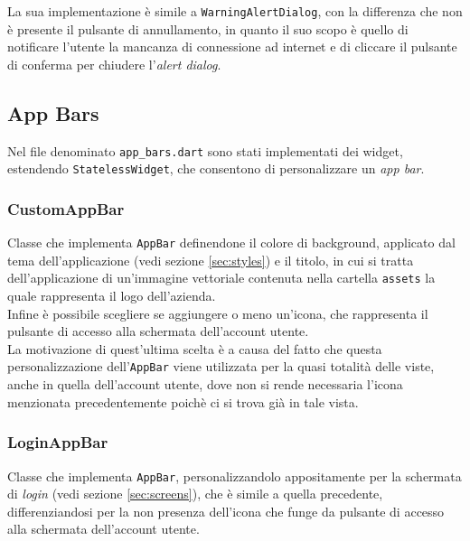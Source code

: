 La sua implementazione è simile a \lstinline{WarningAlertDialog}, con la differenza che non è presente il pulsante di annullamento, in quanto il suo scopo è quello di notificare l'utente la mancanza di connessione ad internet e di cliccare il pulsante di conferma per chiudere l'\emph{alert dialog}.\\

\subsection{App Bars}
\label{subsec:app-bars}

Nel file denominato \lstinline{app_bars.dart} sono stati implementati dei widget, estendendo \lstinline{StatelessWidget}, che consentono di personalizzare un \emph{app bar}.\\

\subsubsection*{CustomAppBar}
\label{subsubsec:custom-app-bar}

Classe che implementa \lstinline{AppBar}\cite{site:app-bar} definendone il colore di background, applicato dal tema dell'applicazione (vedi sezione \ref{sec:styles}) e il titolo, in cui si tratta dell'applicazione di un'immagine vettoriale contenuta nella cartella \lstinline{assets} la quale rappresenta il logo dell'azienda.\\
Infine è possibile scegliere se aggiungere o meno un'icona, che rappresenta il pulsante di accesso alla schermata dell'account utente.\\
La motivazione di quest'ultima scelta è a causa del fatto che questa personalizzazione dell'\lstinline{AppBar} viene utilizzata per la quasi totalità delle viste, anche in quella dell'account utente, dove non si rende necessaria l'icona menzionata precedentemente poichè ci si trova già in tale vista.

\subsubsection*{LoginAppBar}
\label{subsubsec:login-app-bar}

Classe che implementa \lstinline{AppBar}, personalizzandolo appositamente per la schermata di \emph{login} (vedi sezione \ref{sec:screens}), che è simile a quella precedente, differenziandosi per la non presenza dell'icona che funge da pulsante di accesso alla schermata dell'account utente.

